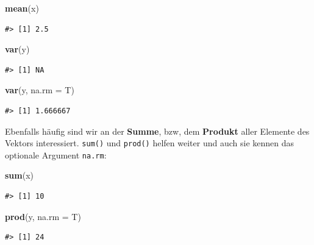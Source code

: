 \documentclass[]{book}
\newenvironment{Shaded}{\begin{snugshade}}{\end{snugshade}}
\newcommand{\KeywordTok}[1]{\textcolor[rgb]{0.13,0.29,0.53}{\textbf{#1}}}
\newcommand{\DataTypeTok}[1]{\textcolor[rgb]{0.13,0.29,0.53}{#1}}
\newcommand{\NormalTok}[1]{#1}
\begin{document}
\begin{Shaded}
\begin{Highlighting}[]
\KeywordTok{mean}\NormalTok{(x)}
\end{Highlighting}
\end{Shaded}

\begin{verbatim}
#> [1] 2.5
\end{verbatim}

\begin{Shaded}
\begin{Highlighting}[]
\KeywordTok{var}\NormalTok{(y)}
\end{Highlighting}
\end{Shaded}

\begin{verbatim}
#> [1] NA
\end{verbatim}

\begin{Shaded}
\begin{Highlighting}[]
\KeywordTok{var}\NormalTok{(y, }\DataTypeTok{na.rm =}\NormalTok{ T)}
\end{Highlighting}
\end{Shaded}

\begin{verbatim}
#> [1] 1.666667
\end{verbatim}

Ebenfalls häufig sind wir an der \textbf{Summe}, bzw, dem
\textbf{Produkt} aller Elemente des Vektors interessiert. \texttt{sum()}
und \texttt{prod()} helfen weiter und auch sie kennen das optionale
Argument \texttt{na.rm}:

\begin{Shaded}
\begin{Highlighting}[]
\KeywordTok{sum}\NormalTok{(x)}
\end{Highlighting}
\end{Shaded}

\begin{verbatim}
#> [1] 10
\end{verbatim}

\begin{Shaded}
\begin{Highlighting}[]
\KeywordTok{prod}\NormalTok{(y, }\DataTypeTok{na.rm =}\NormalTok{ T)}
\end{Highlighting}
\end{Shaded}

\begin{verbatim}
#> [1] 24
\end{verbatim}
\end{document}
